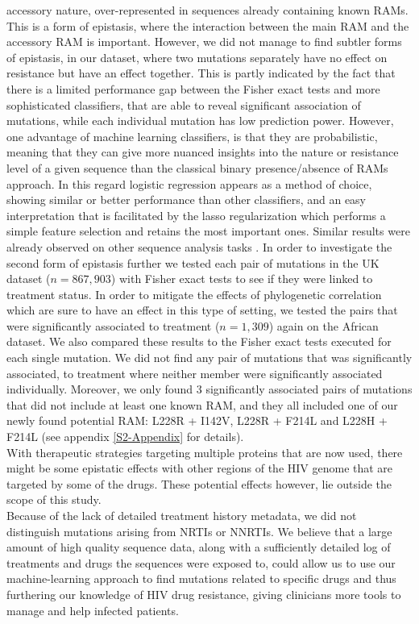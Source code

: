 \documentclass[
  11pt,
  twoside]{scrbook}
\begin{document}
accessory nature, over-represented in sequences already containing known
RAMs. This is a form of epistasis, where the interaction between the
main RAM and the accessory RAM is important. However, we did not manage
to find subtler forms of epistasis, in our dataset, where two mutations
separately have no effect on resistance but have an effect together.
This is partly indicated by the fact that there is a limited performance
gap between the Fisher exact tests and more sophisticated classifiers,
that are able to reveal significant association of mutations, while each
individual mutation has low prediction power. However, one advantage of
machine learning classifiers, is that they are probabilistic, meaning
that they can give more nuanced insights into the nature or resistance
level of a given sequence than the classical binary presence/absence of
RAMs approach. In this regard logistic regression appears as a method of
choice, showing similar or better performance than other classifiers,
and an easy interpretation that is facilitated by the lasso
regularization which performs a simple feature selection and retains the
most important ones. Similar results were already observed on other
sequence analysis tasks \autocite{wuGenomewideAssociationAnalysis2009}. In order
to investigate the second form of epistasis further we tested each pair
of mutations in the UK dataset (\(n=867,903\)) with Fisher exact tests to
see if they were linked to treatment status. In order to mitigate the
effects of phylogenetic correlation which are sure to have an effect in
this type of setting, we tested the pairs that were significantly
associated to treatment (\(n=1,309\)) again on the African dataset. We
also compared these results to the Fisher exact tests executed for each
single mutation. We did not find any pair of mutations that was
significantly associated, to treatment where neither member were
significantly associated individually. Moreover, we only found 3
significantly associated pairs of mutations that did not include at
least one known RAM, and they all included one of our newly found
potential RAM: L228R + I142V, L228R + F214L and L228H + F214L (see appendix \ref{S2-Appendix} for
details).\\
With therapeutic strategies targeting multiple proteins that are now
used, there might be some epistatic effects with other regions of the
HIV genome that are targeted by some of the drugs. These potential
effects however, lie outside the scope of this study.\\
Because of the lack of detailed treatment history metadata, we did not
distinguish mutations arising from NRTIs or NNRTIs. We believe that a
large amount of high quality sequence data, along with a sufficiently
detailed log of treatments and drugs the sequences were exposed to,
could allow us to use our machine-learning approach to find mutations
related to specific drugs and thus furthering our knowledge of HIV drug
resistance, giving clinicians more tools to manage and help infected
patients.
\end{document}
